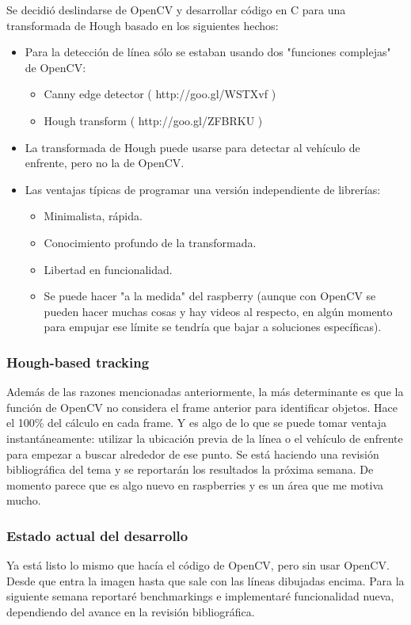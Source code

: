\documentclass[paper=a4, fontsize=11pt]{scrartcl} %
\numberwithin{equation}{section}
\numberwithin{figure}{section}
\numberwithin{table}{section}
\begin{document}
Se decidi\'{o} deslindarse de OpenCV y desarrollar c\'{o}digo en C para una transformada de Hough basado en los siguientes hechos:

\begin{itemize}
	\item Para la detecci\'{o}n de l\'{i}nea s\'{o}lo se estaban usando dos "funciones complejas" de OpenCV:
	\begin{itemize}
		\item Canny edge detector ( http://goo.gl/WSTXvf )
		\item Hough transform ( http://goo.gl/ZFBRKU )
	\end{itemize}
	\item La transformada de Hough puede usarse para detectar al veh\'{i}culo de enfrente, pero no la de OpenCV.
	\item  Las ventajas t\'{i}picas de programar una versi\'{o}n independiente de librer\'{i}as:
	\begin{itemize}
		\item Minimalista, r\'{a}pida.
		\item Conocimiento profundo de la transformada.
		\item Libertad en funcionalidad.
		\item Se puede hacer "a la medida" del raspberry (aunque con OpenCV se pueden hacer muchas cosas y hay videos al respecto, en alg\'{u}n momento para empujar ese l\'{i}mite se tendr\'{i}a que bajar a soluciones espec\'{i}ficas).
	\end{itemize}
\end{itemize}

\subsubsection{Hough-based tracking}
Adem\'{a}s de las razones mencionadas anteriormente, la m\'{a}s determinante es que la funci\'{o}n de OpenCV no considera el frame anterior para identificar objetos. Hace el 100\% del c\'{a}lculo en cada frame. Y es algo de lo que se puede tomar ventaja instant\'{a}neamente: utilizar la ubicaci\'{o}n previa de la l\'{i}nea o el veh\'{i}culo de enfrente para empezar a buscar alrededor de ese punto. Se est\'{a} haciendo una revisi\'{o}n bibliogr\'{a}fica del tema y se reportar\'{a}n los resultados la pr\'{o}xima semana. De momento parece que es algo nuevo en raspberries y es un área que me motiva mucho.

\subsubsection{Estado actual del desarrollo}
Ya est\'{a} listo lo mismo que hac\'{i}a el c\'{o}digo de OpenCV, pero sin usar OpenCV. Desde que entra la imagen hasta que sale con las l\'{i}neas dibujadas encima. Para la siguiente semana reportar\'{e} benchmarkings e implementar\'{e} funcionalidad nueva, dependiendo del avance en la revisi\'{o}n bibliogr\'{a}fica.
\end{document}

